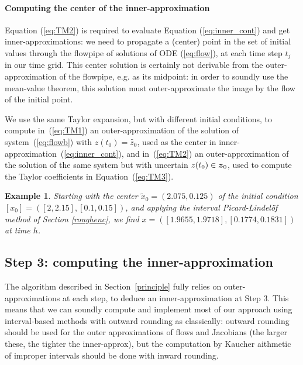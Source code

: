 \documentclass{sig-alternate-05-2015}
\newcommand\ForAuthors[1]%
 {\par\smallskip                     %
  \begin{center}%
   \fbox%
   {\parbox{0.9\linewidth}%
    {\raggedright\sc--- #1}%
   }%
  \end{center}%
  \par\smallskip                     %
 }
\newtheorem{example}{Example}
\def\intvl#1{\mbox{$[ #1 ]$}}
\newtheorem{remark}{Remark}
\begin{document}
\paragraph{Computing the center of the inner-approximation}

Equation (\ref{eq:TM2}) is required to evaluate Equation (\ref{eq:inner_cont}) and get inner-approxima\-tions: we need to propagate a (center) point in the set of initial values 
through the flowpipe of solutions of ODE (\ref{eq:flow}), at each time step $t_j$ in our time grid. This center solution is certainly not derivable from the 
outer-approximation of the flowpipe, e.g. as its midpoint: in order to soundly use the mean-value theorem, this solution must outer-approximate the image by the flow of
the initial point. 
 
We use the same Taylor expansion, but with different initial conditions, to compute in~(\ref{eq:TM1}) an outer-approximation of the solution of system~(\ref{eq:flowb}) 
with $z(t_0)=\tilde{z_0}$, used as the center in inner-approximation~(\ref{eq:inner_cont}), and  in~(\ref{eq:TM2}) an outer-approximation of the solution of the 
same system but with uncertain $z(t_0) \in \z_0$, used to compute the Taylor coefficients in Equation~(\ref{eq:TM3}). %

\begin{example}
\label{runningcenter}
Starting with the center $\tilde{x}_0=(2.075,0.125)$ of the initial condition $\intvl{x_0}=\left(
\left[2,2.15\right],\left[0.1,0.15\right]\right)$, and applying the interval Picard-Lindel\"of method
of Section \ref{roughenc}, 
we find $x=\left(\left[1.9655, 1.9718\right], 
\left[0.1774, 0.1831\right]
\right)$ at time $h$.  
\end{example}


\subsection{Step 3: computing the inner-approximation}
\label{practicalissues}

The algorithm described in Section~\ref{principle} fully relies on outer-approximations at each step, 
to deduce an inner-approxi\-mation at Step 3. This means that we can soundly compute and implement most of our approach using interval-based 
methods with outward rounding as classically: outward rounding should be used for the outer approximations 
of flows and Jacobians (the larger these, the tighter the inner-approx), 
but the computation by Kaucher aithmetic of improper intervals should be done with inward rounding. 
\end{document}
